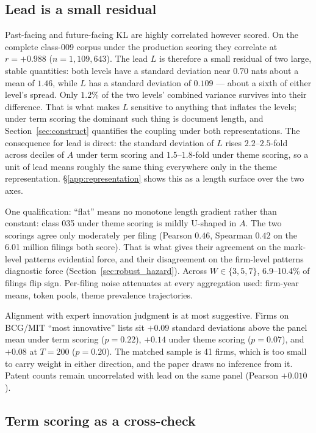 \subsection{Lead is a small residual}

Past-facing and future-facing KL are highly correlated however scored. On the
complete class-009 corpus under the production scoring they correlate at
$r = +0.988$ ($n = 1{,}109{,}643$). The lead $L$ is therefore a small residual
of two large, stable quantities: both levels have a standard deviation near
$0.70$ nats about a mean of $1.46$, while $L$ has a standard deviation of
$0.109$ --- about a sixth of either level's spread. Only $1.2\%$ of the two
levels' combined variance survives into their difference. That is what makes $L$ sensitive to
anything that inflates the levels; under term scoring the dominant such
thing is document length, and Section~\ref{sec:construct} quantifies the
coupling under both representations. The consequence for lead is direct:
the standard deviation of $L$ rises $2.2$--$2.5$-fold across deciles of
$A$ under term scoring and $1.5$--$1.8$-fold under theme scoring, so a
unit of lead means roughly the same thing everywhere only in the theme
representation. \S\ref{app:representation} shows this as a length
surface over the two axes.

One qualification: ``flat'' means no monotone
length gradient rather than constant: class 035 under theme scoring is
mildly U-shaped in $A$. The two scorings agree only moderately per
filing (Pearson $0.46$, Spearman $0.42$ on the 6.01 million filings both
score). That is what gives their agreement on the mark-level patterns
evidential force, and their disagreement on the firm-level patterns
diagnostic force (Section~\ref{sec:robust_hazard}). Across
$W \in \{3, 5, 7\}$, 6.9--10.4\% of filings flip sign. Per-filing noise
attenuates at every aggregation used: firm-year means, token pools,
theme prevalence trajectories.

Alignment with expert innovation judgment is at most suggestive. Firms on
BCG/MIT ``most innovative'' lists sit $+0.09$ standard deviations above the panel mean
under term scoring ($p = 0.22$), $+0.14$ under theme scoring
($p = 0.07$), and $+0.08$ at $T = 200$ ($p = 0.20$). The matched
sample is 41 firms, which is too small to carry weight in either
direction, and the paper draws no inference from it. Patent counts remain
uncorrelated with lead on the same panel (Pearson $+0.010$).

\subsection{Term scoring as a cross-check}\label{app:scoring}

